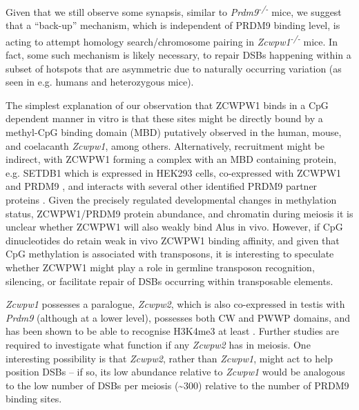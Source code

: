 Given that we still observe some synapsis, similar to \textit{Prdm9\textsuperscript{-/-}} mice, we suggest that a ``back-up'' mechanism, which is independent of PRDM9 binding level, is acting to attempt homology search/chromosome pairing in \textit{Zcwpw1\textsuperscript{-/-}} mice.
In fact, some such mechanism is likely necessary, to repair DSBs happening within a subset of hotspots that are asymmetric due to naturally occurring variation (as seen in e.g. humans and heterozygous mice).

\iffalse
If our observed >9-fold changes in relative DMC1 levels for strongly vs. weakly bound hotspots purely reflect increased DMC1 persistence, it might be this mechanism is greatly slower than the PRDM9-dependent pathway for wild-type mice.
In turn, this could explain many – or all – of the downstream phenotypes in these mice, as consequences of delayed homology search.
\fi


The simplest explanation of our observation that ZCWPW1 binds in a CpG dependent manner in vitro is that these sites might be directly bound by a methyl-CpG binding domain (MBD) putatively observed in the human, mouse, and coelacanth \textit{Zcwpw1}, among others.
Alternatively, recruitment might be indirect, with ZCWPW1 forming a complex with an MBD containing protein, e.g. SETDB1 which is expressed in HEK293 cells, co-expressed with ZCWPW1 and PRDM9 \parencite{Jung2019Unified, Schultz2002SETDB1}, and interacts with several other identified PRDM9 partner proteins \parencite{Mulligan2008CDYL, Parvanov2017PRDM9}.
Given the precisely regulated developmental changes in methylation status, ZCWPW1/PRDM9 protein abundance, and chromatin during meiosis \parencite{Gaysinskaya2018Transient, SeisenbergerStefanie2013Reprogramming} it is unclear whether ZCWPW1 will also weakly bind Alus in vivo.
However, if CpG dinucleotides do retain weak in vivo ZCWPW1 binding affinity, and given that CpG methylation is associated with transposons, it is interesting to speculate whether ZCWPW1 might play a role in germline transposon recognition, silencing, or facilitate repair of DSBs occurring within transposable elements.

\textit{Zcwpw1} possesses a paralogue, \textit{Zcwpw2}, which is also co-expressed in testis with \textit{Prdm9} (although at a lower level), possesses both CW and PWWP domains, and has been shown to be able to recognise H3K4me3 at least \parencite{Liu2016Familywide}.
Further studies are required to investigate what function if any \textit{Zcwpw2} has in meiosis.
One interesting possibility is that \textit{Zcwpw2}, rather than \textit{Zcwpw1}, might act to help position DSBs – if so, its low abundance relative to \textit{Zcwpw1} would be analogous to the low number of DSBs per meiosis (\textasciitilde300) relative to the number of PRDM9 binding sites.

